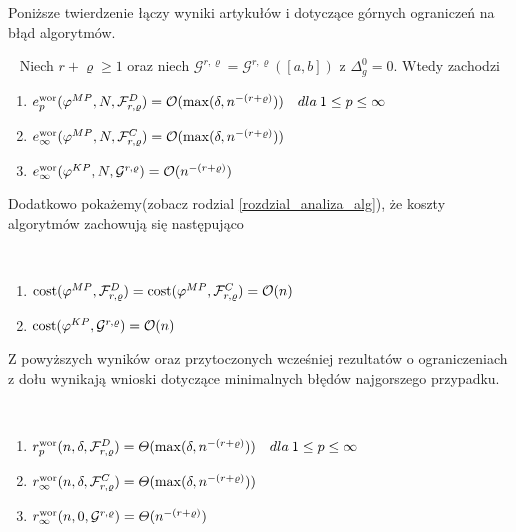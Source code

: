 \documentclass[oik, pdftex, robocza, man]{mgrwms}
\begin{document}
    Poniższe twierdzenie łączy wyniki artykułów \cite{CoDF} i \cite{AoP} dotyczące górnych ograniczeń na błąd algorytmów.
    
    \begin{thm}~%
        Niech $r+\varrho \geq 1$ oraz niech $\mathcal{G}^{r,\varrho} = \mathcal{G}^{r,\varrho}([a,b])$ z $\Delta_{g}^{0} = 0$. Wtedy zachodzi
        \begin{enumerate}[label=(\roman*)]
            \item $e_{p}^{\mathrm{wor}}(\varphi^{MP},N,\mathcal{F}_{r,\varrho}^{D}) = \mathcal{O}(\max(\delta, n^{-(r+\varrho)})) \quad dla \: 1 \leq p \leq \infty$
            \item $e_{\infty}^{\mathrm{wor}}(\varphi^{MP},N,\mathcal{F}_{r,\varrho}^{C}) = \mathcal{O}(\max(\delta, n^{-(r+\varrho)}))$
            \item $e_{\infty}^{\mathrm{wor}}(\varphi^{KP},N,\mathcal{G}^{r,\varrho}) = \mathcal{O}(n^{-(r+\varrho)})$
        \end{enumerate}
    \end{thm}

    Dodatkowo pokażemy(zobacz rodzial \ref{rozdzial_analiza_alg}), że koszty algorytmów zachowują się następująco

    \begin{stw}~%
        \begin{enumerate}
            \item $\mathrm{cost}(\varphi^{MP}, \mathcal{F}_{r,\varrho}^{D}) = \mathrm{cost}(\varphi^{MP}, \mathcal{F}_{r,\varrho}^{C}) = \mathcal{O}(n)$
            \item $\mathrm{cost}(\varphi^{KP}, \mathcal{G}^{r,\varrho}) = \mathcal{O}(n)$
        \end{enumerate}
    \end{stw}

    Z powyższych wyników oraz przytoczonych wcześniej rezultatów o ograniczeniach z dołu wynikają wnioski dotyczące minimalnych błędów najgorszego przypadku.

    \begin{cor}~
        \begin{enumerate}[label=(\roman*)]
            \item $r^{\mathrm{wor}}_{p}(n, \delta, \mathcal{F}^{D}_{r,\varrho}) = \varTheta(\max(\delta, n^{-(r+\varrho)})) \quad dla \: 1 \leq p \leq \infty$
            \item $r^{\mathrm{wor}}_{\infty}(n, \delta, \mathcal{F}^{C}_{r,\varrho}) = \varTheta(\max(\delta, n^{-(r+\varrho)}))$
            \item $r^{\mathrm{wor}}_{\infty}(n, 0, \mathcal{G}^{r,\varrho}) = \varTheta(n^{-(r+\varrho)})$
        \end{enumerate}
    \end{cor}
    
\end{document}
